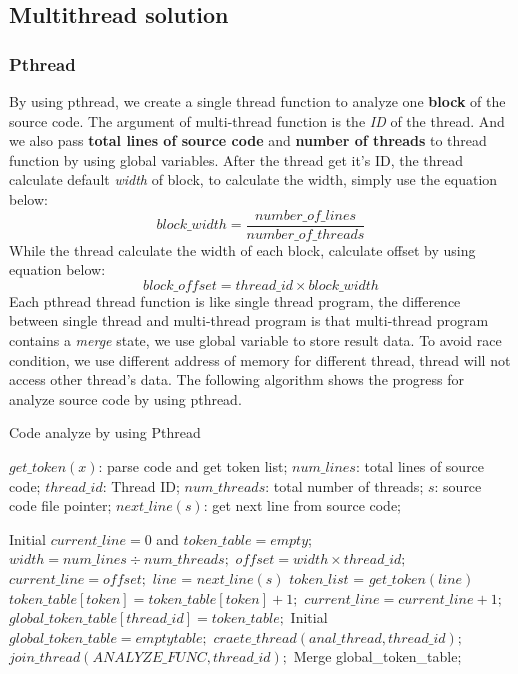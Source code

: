 \documentclass{acm_proc_article-sp}
\begin{document}
\subsection{Multithread solution}
\subsubsection{Pthread}
	By using pthread, we create a single thread function to analyze one \textbf{block}
	of the source code. The argument of multi-thread function is the \textit{ID} of the thread.
	And we also pass \textbf{total lines of source code} and \textbf{number of threads} to
	thread function by using global variables.
	After the thread get it's ID, the thread calculate default \textit{width} of block, to calculate
	the width, simply use the equation below:
	\begin{displaymath}
	block\_width = \frac{number\_of\_lines}{number\_of\_threads}
	\end{displaymath}
	While the thread calculate the width of each block, calculate offset by using equation below:
	\begin{displaymath}
	block\_offset = thread\_id \times block\_width
	\end{displaymath}
	Each pthread thread function is like single thread program, the difference between single thread
	and multi-thread program is that multi-thread program contains a \textit{merge} state, we use
	global variable to store result data. To avoid race condition, we use different address of memory
	for different thread, thread will not access other thread's data. The following algorithm shows
	the progress for analyze source code by using pthread.
	\begin{algorithm}[h]
		\caption{Code analyze by using Pthread}
		\begin{algorithmic}[1]
			\Require
				$get\_token(x)$: parse code and get token list;
				$num\_lines$: total lines of source code;
				$thread\_id$: Thread ID;
				$num\_threads$: total number of threads;
				$s$: source code file pointer;
				$next\_line(s)$: get next line from source code;

				\State Initial $current\_line=0$ and $token\_table = empty$;
				\State $width = num\_lines \div num\_threads;$
				\State $offset = width \times thread\_id;$
				\State $current\_line = offset;$
					\State $line$ = $next\_line(s)$
					\State $token\_list$ = $get\_token(line)$
						\State $token\_table[token] = token\_table[token] + 1;$
					\EndFor
					\State $current\_line = current\_line + 1;$
				\EndWhile
				\State $global\_token\_table[thread\_id] = token\_table;$
			\EndFunction
			\State Initial $global\_token\_table = empty table;$
				\State $craete\_thread(anal\_thread, thread\_id);$
			\EndFor
				\State $join\_thread(ANALYZE\_FUNC, thread\_id);$
			\EndFor
			\State Merge global\_token\_table;
		\end{algorithmic}
	\end{algorithm}
\end{document}

